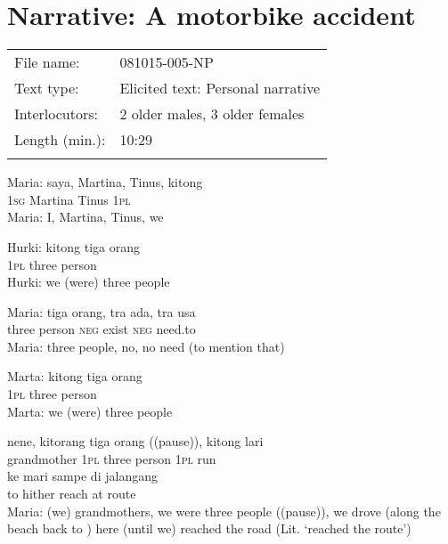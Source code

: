 \section{Narrative: A motorbike accident}
\label{Para_B.5}
\begin{tabular}{ll}
\lsptoprule
File name: &  081015-005-NP\\
Text type: &  Elicited text: Personal narrative\footnotemark{}\\
Interlocutors: &  2 older males, 3 older females\\
Length (min.): &  10:29\\
\lspbottomrule
\end{tabular}
\setcounter{equation}{0}
\ea
\gll   Maria:   saya,   Martina,   Tinus,   kitong\\
{}  \textsc{1sg}   Martina   Tinus   \textsc{1pl}\\
\glt
Maria: I, Martina, Tinus, we
\z

\ea
\gll   Hurki:   kitong   tiga   orang\\
{}  \textsc{1pl}   three   person\\
\glt
Hurki: we (were) three people
\z

\ea
\gll   Maria:   tiga   orang,   tra   ada,   tra   usa\\
 {} three   person   \textsc{neg}   exist   \textsc{neg}   need.to\\
\glt
Maria: three people, no, no need (to mention that)
\z

\ea
\gll   Marta:   kitong   tiga   orang\\
{}  \textsc{1pl}   three   person\\
\glt
Marta: we (were) three people
\z

\ea
{}    {nene,}    {kitorang}   tiga   orang   ((pause)),   kitong   lari\\
   {}    {grandmother}    {\textsc{1pl}}   three   person      \textsc{1pl}   run\\
\gll ke    {mari}   sampe    {di}    {jalangang}\\
  to    {hither}   reach    {at}    {route}\\
\glt
Maria: (we) grandmothers, we were three people ((pause)), we drove (along the beach back to ) here (until we) reached the road (Lit. ‘reached the route’)
\z

